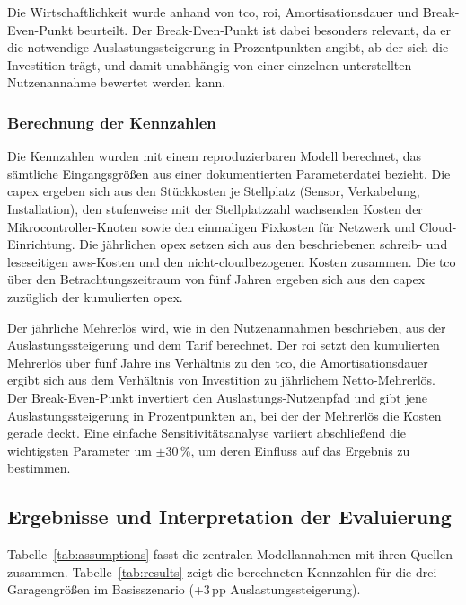 Die Wirtschaftlichkeit wurde anhand von \ac{tco}, \ac{roi}, Amortisationsdauer und Break-Even-Punkt beurteilt. Der Break-Even-Punkt ist dabei besonders relevant, da er die notwendige Auslastungssteigerung in Prozentpunkten angibt, ab der sich die Investition trägt, und damit unabhängig von einer einzelnen unterstellten Nutzenannahme bewertet werden kann.

\subsubsection{Berechnung der Kennzahlen}

Die Kennzahlen wurden mit einem reproduzierbaren Modell berechnet, das sämtliche Eingangsgrößen aus einer dokumentierten Parameterdatei bezieht. Die \ac{capex} ergeben sich aus den Stückkosten je Stellplatz (Sensor, Verkabelung, Installation), den stufenweise mit der Stellplatzzahl wachsenden Kosten der Mikrocontroller-Knoten sowie den einmaligen Fixkosten für Netzwerk und Cloud-Einrichtung. Die jährlichen \ac{opex} setzen sich aus den beschriebenen schreib- und leseseitigen \ac{aws}-Kosten und den nicht-cloudbezogenen Kosten zusammen. Die \ac{tco} über den Betrachtungszeitraum von fünf Jahren ergeben sich aus den \ac{capex} zuzüglich der kumulierten \ac{opex}.

Der jährliche Mehrerlös wird, wie in den Nutzenannahmen beschrieben, aus der Auslastungssteigerung und dem Tarif berechnet. Der \ac{roi} setzt den kumulierten Mehrerlös über fünf Jahre ins Verhältnis zu den \ac{tco}, die Amortisationsdauer ergibt sich aus dem Verhältnis von Investition zu jährlichem Netto-Mehrerlös. Der Break-Even-Punkt invertiert den Auslastungs-Nutzenpfad und gibt jene Auslastungssteigerung in Prozentpunkten an, bei der der Mehrerlös die Kosten gerade deckt. Eine einfache Sensitivitätsanalyse variiert abschließend die wichtigsten Parameter um $\pm$30\,\%, um deren Einfluss auf das Ergebnis zu bestimmen.

\subsection{Ergebnisse und Interpretation der Evaluierung}\label{sec:results}

Tabelle~\ref{tab:assumptions} fasst die zentralen Modellannahmen mit ihren Quellen zusammen. Tabelle~\ref{tab:results} zeigt die berechneten Kennzahlen für die drei Garagengrößen im Basisszenario (+3\,pp Auslastungssteigerung).

